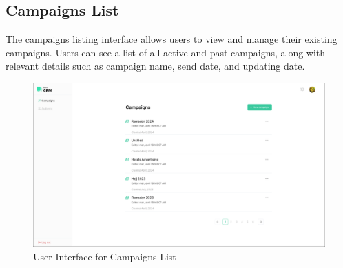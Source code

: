 \subsection{Campaigns List}

The campaigns listing interface allows users to view and manage their existing campaigns. Users can see a list of all active and past campaigns, along with relevant details such as campaign name, send date, and updating date.
\begin{figure}[ht]
	\centering
	\includegraphics[width=0.9\linewidth]{Images/Sprint1/screenshots/Screenshot 2024-05-26 214015.png}
	\caption{User Interface for Campaigns List}
	\label{fig:User Interface for Campaigns List}
\end{figure}
